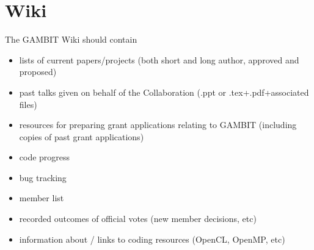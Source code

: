 \section{Wiki}

The GAMBIT Wiki should contain 
\begin{itemize}
\item lists of current papers/projects (both short and long author, approved and proposed)
\item past talks given on behalf of the Collaboration (.ppt or .tex+.pdf+associated files)
\item resources for preparing grant applications relating to GAMBIT (including copies of past grant applications)
\item code progress
\item bug tracking
\item member list
\item recorded outcomes of official votes (new member decisions, etc)
\item information about / links to coding resources (OpenCL, OpenMP, etc)
\end{itemize}


